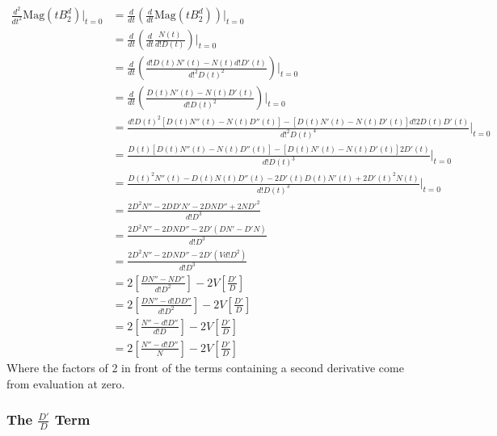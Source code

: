 \documentclass[11pt]{article}
\theoremstyle{definition}
\theoremstyle{definition}
\theoremstyle{plain}
\theoremstyle{plain}
\theoremstyle{plain}
\theoremstyle{definition}
\begin{document}
\begin{align*}
\frac{d^2}{dt^2}\text{Mag}(tB_2^d)\big\vert_{t=0} &= \frac{d}{dt}\left(\frac{d}{dt}\text{Mag}(tB_2^d)\right)\big\vert_{t=0} \\
&= \frac{d}{dt}\left(\frac{d}{dt}\frac{N(t)}{d!D(t)}\right)\big\vert_{t=0} \\
&= \frac{d}{dt}\left(\frac{d!D(t)N'(t)-N(t)d!D'(t)}{d!^2D(t)^2}\right)\big\vert_{t=0} \\
&= \frac{d}{dt}\left(\frac{D(t)N'(t)-N(t)D'(t)}{d!D(t)^2}\right)\big\vert_{t=0} \\
&= \frac{d!D(t)^2[D(t)N''(t)-N(t)D''(t)]-[D(t)N'(t)-N(t)D'(t)]d!2D(t)D'(t)}{d!^2D(t)^4}\big\vert_{t=0} \\
&= \frac{D(t)[D(t)N''(t)-N(t)D''(t)]-[D(t)N'(t)-N(t)D'(t)]2D'(t)}{d!D(t)^3}\big\vert_{t=0} \\
&= \frac{D(t)^2N''(t)-D(t)N(t)D''(t)-2D'(t)D(t)N'(t)+2D'(t)^2N(t)}{d!D(t)^3}\big\vert_{t=0} \\
&= \frac{2D^2N''-2DD'N'-2DND''+2ND'^2}{d!D^3} \\
&= \frac{2D^2N''-2DND''-2D'(DN'-D'N)}{d!D^3} \\
&= \frac{2D^2N''-2DND''-2D'(Vd!D^2)}{d!D^3} \\
&= 2\left[\frac{DN''-ND''}{d!D^2}\right]-2V\left[\frac{D'}{D}\right] \\
&= 2\left[\frac{DN''-d!DD''}{d!D^2}\right] - 2V\left[\frac{D'}{D}\right] \\
&= 2\left[\frac{N''-d!D''}{d!D}\right] - 2V\left[\frac{D'}{D}\right] \\
&= 2\left[\frac{N''-d!D''}{N}\right] - 2V\left[\frac{D'}{D}\right]
\end{align*}
Where the factors of 2 in front of the terms containing a second derivative come from evaluation at zero.

\subsubsection*{The $\frac{D'}{D}$ Term}
\end{document}
